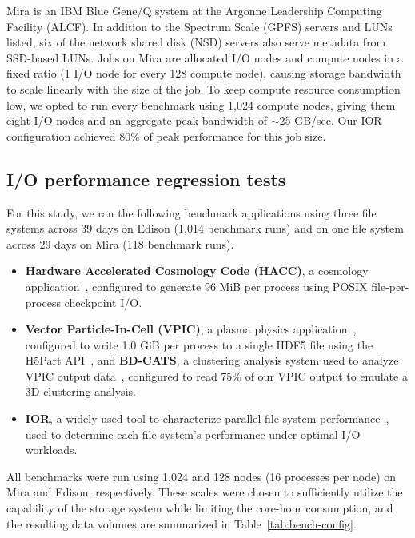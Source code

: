 Mira is an IBM Blue Gene/Q system at the Argonne Leadership Computing Facility (ALCF).
In addition to the Spectrum Scale (GPFS) servers and LUNs listed, six of the network shared disk (NSD) servers also serve metadata from SSD-based LUNs.
Jobs on Mira are allocated I/O nodes and compute nodes in a fixed ratio (1 I/O node for every 128 compute node), causing storage bandwidth to scale linearly with the size of the job.
To keep compute resource consumption low, we opted to run every benchmark using 1,024 compute nodes, giving them eight I/O nodes and an aggregate peak bandwidth of $\sim$25 GB/sec.
Our IOR configuration achieved 80\% of peak performance for this job size.

\subsection{I/O performance regression tests} \label{sec:methods/tests}

For this study, we ran the following benchmark applications
using three file systems across 39 days on Edison (1,014 benchmark runs) and on one file system across 29 days on Mira (118 benchmark runs).

\begin{itemize}[leftmargin=*]
\item 
\textbf{Hardware Accelerated Cosmology Code (HACC)}, a cosmology application~\cite{habib2012}, configured to generate 96 MiB per process using POSIX file-per-process checkpoint I/O.
 \item
\textbf{Vector Particle-In-Cell (VPIC)}, a plasma physics application~\cite{Bowers2008}, configured to write 1.0 GiB per process to a single HDF5 file using the H5Part API~\cite{H5Part}, and 
\textbf{BD-CATS}, a clustering analysis system used to analyze VPIC output data~\cite{Patwary2015}, configured to read 75\% of our VPIC output to emulate a 3D clustering analysis.
\item
\textbf{IOR}, a widely used tool to characterize parallel file system performance~\cite{Yildiz2016,Xie2012,Lofstead2010,Uselton2010}, used to determine each file system's performance under optimal I/O workloads.
 \end{itemize}

All benchmarks were run using 1,024 and 128 nodes (16 processes per node) on Mira and Edison, respectively.
These scales were chosen to sufficiently utilize the capability of the storage system while limiting the core-hour consumption,
and the resulting data volumes are summarized in Table~\ref{tab:bench-config}.

